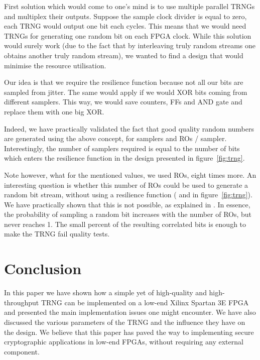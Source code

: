 \documentclass[conference]{IEEEtran}
\begin{document}
First solution which would come to one's mind is to use multiple parallel TRNGs and multiplex their outputs. Suppose the sample clock divider is equal to zero, each TRNG would output one bit each  cycles. This means that we would need  TRNGs for generating one random bit on each FPGA clock. While this solution would surely work (due to the fact that by interleaving truly random streams one obtains another truly random stream), we wanted to find a design that would minimise the resource utilisation.

Our idea is that we require the resilience function because not all our bits are sampled from jitter. The same would apply if we would XOR bits coming from different samplers. This way, we would save  counters, FFs and AND gate and replace them with one big XOR.

Indeed, we have practically validated the fact that good quality random numbers are generated using the above concept, for  samplers and  ROs / sampler. Interestingly, the number of samplers required is equal to the number of bits which enters the resilience function in the design presented in figure~\ref{fig:trng}.

\newpage Note however, what for the mentioned values, we used  ROs, eight times more. An interesting question is whether this number of ROs could be used to generate a random bit stream, without using a resilience function ( and  in figure~\ref{fig:trng}). We have practically shown that this is not possible, as explained in \cite{Sc06}. In essence, the probability of sampling a random bit increases with the number of ROs, but never reaches 1. The small percent of the resulting correlated bits is enough to make the TRNG fail quality tests.

\section{Conclusion}

In this paper we have shown how a simple yet of high-quality and high-throughput TRNG can be implemented on a low-end Xilinx Spartan 3E FPGA and presented the main implementation issues one might encounter. We have also discussed the various parameters of the TRNG and the influence they have on the design. We believe that this paper has paved the way to implementing secure cryptographic applications in low-end FPGAs, without requiring any external component.
\end{document}
